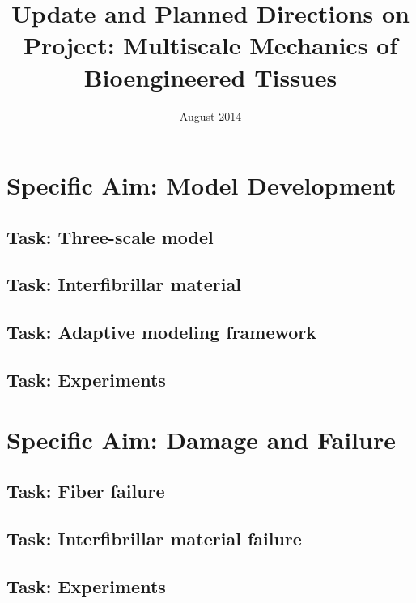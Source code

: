\documentclass{article}
\begin{document}

\title{Update and Planned Directions on Project: Multiscale Mechanics of Bioengineered Tissues}
\date{August 2014}
\maketitle

\section{Specific Aim: Model Development}

\subsection{Task: Three-scale model}

\subsection{Task: Interfibrillar material}

\subsection{Task: Adaptive modeling framework}

\subsection{Task: Experiments}

\section{Specific Aim: Damage and Failure}

\subsection{Task: Fiber failure}

\subsection{Task: Interfibrillar material failure}

\subsection{Task: Experiments}
\end{document}
